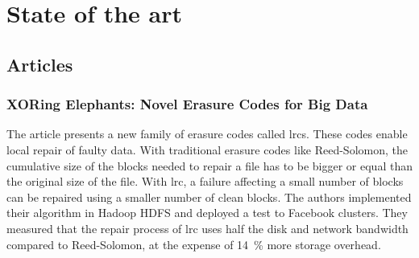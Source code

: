 \chapter{State of the art}

\section{Articles}

\subsection{XORing Elephants: Novel Erasure Codes for Big Data \autocite{XorbasVLDB}}

The article presents a new family of erasure codes called \acp{lrc}.
These codes enable local repair of faulty data.
With traditional erasure codes like Reed-Solomon, the cumulative size of the blocks needed to repair a file has to be bigger or equal than the original size of the file.
With \ac{lrc}, a failure affecting a small number of blocks can be repaired using a smaller number of clean blocks.
The authors implemented their algorithm in Hadoop HDFS and deployed a test to Facebook clusters.
They measured that the repair process of \ac{lrc} uses half the disk and network bandwidth compared to Reed-Solomon, at the expense of \SI{14}{\percent} more storage overhead.
